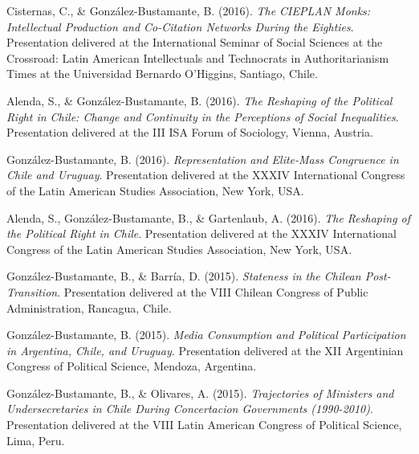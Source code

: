 \begin{publications}
\begin{benumerate}{71}
\item{\small Cisternas, C., \& González-Bustamante, B. (2016). {\itshape The CIEPLAN Monks: Intellectual Production and Co-Citation Networks During the Eighties}. Presentation delivered at the International Seminar of Social Sciences at the Crossroad: Latin American Intellectuals and Technocrats in Authoritarianism Times at the Universidad Bernardo O'Higgins, Santiago, Chile.}\vspace{1mm}

\item{\small Alenda, S., \& González-Bustamante, B. (2016). {\itshape The Reshaping of the Political Right in Chile: Change and Continuity in the Perceptions of Social Inequalities}. Presentation delivered at the III ISA Forum of Sociology, Vienna, Austria.}\vspace{1mm}

\item{\small González-Bustamante, B. (2016). {\itshape Representation and Elite-Mass Congruence in Chile and Uruguay}. Presentation delivered at the XXXIV International Congress of the Latin American Studies Association, New York, USA.}\vspace{1mm}

\item{\small Alenda, S., González-Bustamante, B., \& Gartenlaub, A. (2016). {\itshape The Reshaping of the Political Right in Chile}. Presentation delivered at the XXXIV International Congress of the Latin American Studies Association, New York, USA.}\vspace{1mm}

\item{\small González-Bustamante, B., \& Barría, D. (2015). {\itshape Stateness in the Chilean Post-Transition}. Presentation delivered at the VIII Chilean Congress of Public Administration, Rancagua, Chile.}\vspace{1mm}

\item{\small González-Bustamante, B. (2015). {\itshape Media Consumption and Political Participation in Argentina, Chile, and Uruguay}. Presentation delivered at the XII Argentinian Congress of Political Science, Mendoza, Argentina.}\vspace{1mm}

\item{\small González-Bustamante, B., \& Olivares, A. (2015). {\itshape Trajectories of Ministers and Undersecretaries in Chile During Concertacion Governments (1990-2010)}. Presentation delivered at the VIII Latin American Congress of Political Science, Lima, Peru.}\vspace{1mm}


\end{benumerate}
\end{publications}
